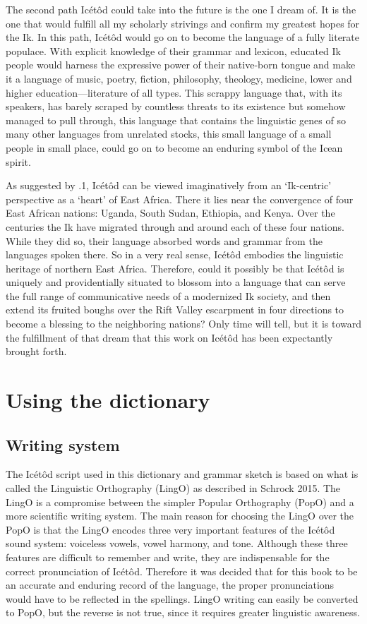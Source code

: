 The second path Icétôd could take into the future is the one I dream of. It is the one that would fulfill all my scholarly strivings and confirm my greatest hopes for the Ik. In this path, Icétôd would go on to become the language of a fully literate populace. With explicit knowledge of their grammar and lexicon, educated Ik people would harness the expressive power of their native-born tongue and make it a language of music, poetry, fiction, philosophy, theology, medicine, lower and higher education—literature of all types. This scrappy language that, with its speakers, has barely scraped by countless threats to its existence but somehow managed to pull through, this language that contains the linguistic genes of so many other languages from unrelated stocks, this small language of a small people in small place, could go on to become an enduring symbol of the Icean spirit. 

As suggested by .1, Icétôd can be viewed imaginatively from an ‘Ik-centric’ perspective as a ‘heart’ of East Africa. There it lies near the convergence of four East African nations: Uganda, South Sudan, Ethiopia, and Kenya. Over the centuries the Ik have migrated through and around each of these four nations. While they did so, their language absorbed words and grammar from the languages spoken there. So in a very real sense, Icétôd embodies the linguistic heritage of northern East Africa. Therefore, could it possibly be that Icétôd is uniquely and providentially situated to blossom into a language that can serve the full range of communicative needs of a modernized Ik society, and then extend its fruited boughs over the Rift Valley escarpment in four directions to become a blessing to the neighboring nations? Only time will tell, but it is toward the fulfillment of that dream that this work on Icétôd has been expectantly brought forth.
 
\section{Using the dictionary}
\subsection{Writing system}

The Icétôd script used in this dictionary and grammar sketch is based on what is called the Linguistic Orthography (LingO) as described in Schrock 2015. The LingO is a compromise between the simpler Popular Orthography (PopO) and a more scientific writing system. The main reason for choosing the LingO over the PopO is that the LingO encodes three very important features of the Icétôd sound system: voiceless vowels, vowel harmony, and tone. Although these three features are difficult to remember and write, they are indispensable for the correct pronunciation of Icétôd. Therefore it was decided that for this book to be an accurate and enduring record of the language, the proper pronunciations would have to be reflected in the spellings. LingO writing can easily be converted to PopO, but the reverse is not true, since it requires greater linguistic awareness.

